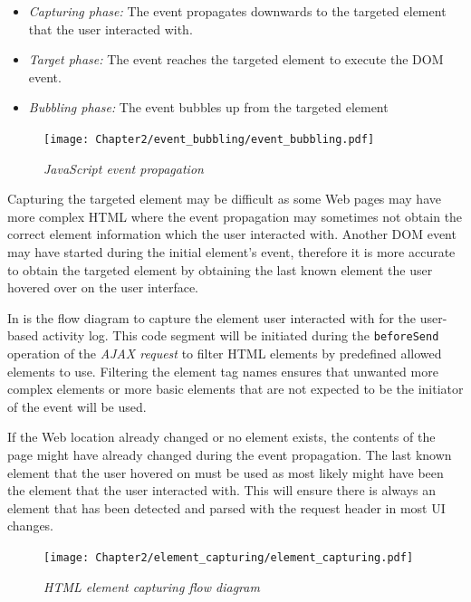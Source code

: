 \begin{itemize}
	\item \textit{Capturing phase:} The event propagates downwards to the targeted element that the user interacted with.
	\item \textit{Target phase:} The event reaches the targeted element to execute the DOM event.
	\item \textit{Bubbling phase:} The event bubbles up from the targeted element
\end{itemize}

\begin{figure}[!htb] %
	\centering %
	\texttt{[image: Chapter2/event\_bubbling/event\_bubbling.pdf]}
	\caption[JavaScript event propagation]
	{\textit{JavaScript event propagation~\cite{EventBubbling}}}\label{fig:ch2_event_bubbling}
\end{figure}

Capturing the targeted element may be difficult as some Web pages may have more complex HTML where the event propagation may sometimes not obtain the correct element information which the user interacted with. Another DOM event may have started during the initial element's event, therefore it is more accurate to obtain the targeted element by obtaining the last known element the user hovered over on the user interface.\par In  is the flow diagram to capture the element user interacted with for the user-based activity log. This code segment will be initiated during the \texttt{beforeSend} operation of the \textit{AJAX request} to filter HTML elements by predefined allowed elements to use. Filtering the element tag names ensures that unwanted more complex elements or more basic elements that are not expected to be the initiator of the event will be used. \par If the Web location already changed or no element exists, the contents of the page might have already changed during the event propagation. The last known element that the user hovered on must be used as most likely might have been the element that the user interacted with. This will ensure there is always an element that has been detected and parsed with the request header in most UI changes.

\clearpage

\begin{figure}[!htb] %
	\centering %
	\texttt{[image: Chapter2/element\_capturing/element\_capturing.pdf]}
	\caption[HTML element capturing flow diagram]
	{\textit{HTML element capturing flow diagram}}\label{fig:ch2_element_event_capturing}
\end{figure}

